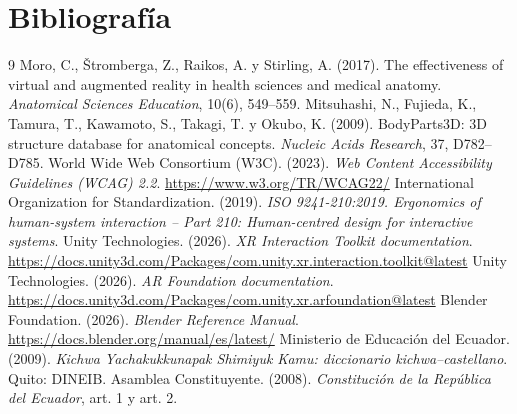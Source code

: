 \documentclass[11pt,a4paper]{article}
\begin{document}
\section{Bibliografía}
\begingroup
\renewcommand{\section}[2]{}
\begin{thebibliography}{9}
 Moro, C., Štromberga, Z., Raikos, A. y Stirling, A. (2017). The effectiveness of virtual and augmented reality in health sciences and medical anatomy. \emph{Anatomical Sciences Education}, 10(6), 549--559.
 Mitsuhashi, N., Fujieda, K., Tamura, T., Kawamoto, S., Takagi, T. y Okubo, K. (2009). BodyParts3D: 3D structure database for anatomical concepts. \emph{Nucleic Acids Research}, 37, D782--D785.
 World Wide Web Consortium (W3C). (2023). \emph{Web Content Accessibility Guidelines (WCAG) 2.2}. \url{https://www.w3.org/TR/WCAG22/}
 International Organization for Standardization. (2019). \emph{ISO 9241-210:2019. Ergonomics of human-system interaction -- Part 210: Human-centred design for interactive systems}.
 Unity Technologies. (2026). \emph{XR Interaction Toolkit documentation}. \url{https://docs.unity3d.com/Packages/com.unity.xr.interaction.toolkit@latest}
 Unity Technologies. (2026). \emph{AR Foundation documentation}. \url{https://docs.unity3d.com/Packages/com.unity.xr.arfoundation@latest}
 Blender Foundation. (2026). \emph{Blender Reference Manual}. \url{https://docs.blender.org/manual/es/latest/}
 Ministerio de Educación del Ecuador. (2009). \emph{Kichwa Yachakukkunapak Shimiyuk Kamu: diccionario kichwa--castellano}. Quito: DINEIB.
 Asamblea Constituyente. (2008). \emph{Constitución de la República del Ecuador}, art. 1 y art. 2.
\end{thebibliography}
\endgroup
\end{document}
